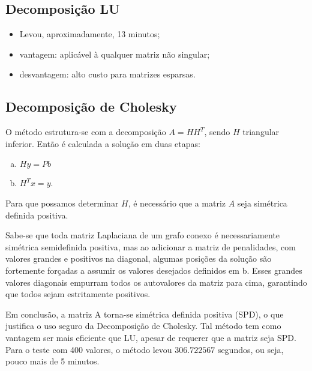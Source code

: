 \documentclass{article} %
\theoremstyle{definition}
\begin{document}
        \subsection*{Decomposição LU}
            \begin{itemize}
                \item  Levou, aproximadamente, 13 minutos;
                \item vantagem: aplicável à qualquer matriz não singular;
                \item desvantagem: alto custo para matrizes esparsas.
            \end{itemize}
            \subsection*{Decomposição de Cholesky}
            
                O método estrutura-se com a decomposição $A = HH^T$, sendo $H$ triangular
                inferior.
                Então é calculada a solução em duas etapas:
                \begin{enumerate}[a)]
                    \item $Hy = Pb$
                    \item $H^Tx = y$.
                \end{enumerate}
                Para que possamos determinar $H$, é necessário que a matriz $A$ seja simétrica
                definida positiva.

                Sabe-se que toda matriz Laplaciana de um grafo conexo é necessariamente simétrica 
                semidefinida
                positiva, mas ao adicionar a matriz de penalidades, com valores grandes e positivos 
                na diagonal,
                algumas posições da solução são fortemente forçadas a assumir os valores desejados
                definidos em b.
                Esses grandes valores diagonais empurram todos os autovalores da matriz para cima,
                garantindo
                que todos sejam estritamente positivos.

                Em conclusão, a matriz A torna-se simétrica definida positiva
                (SPD), o que justifica o uso seguro da Decomposição de Cholesky.
                Tal método tem como vantagem ser mais eficiente que LU, apesar de requerer que a 
                matriz seja SPD.
                Para o teste com 400 valores, o método levou $306.722567$ segundos, ou seja, 
                pouco mais de 5 minutos.
\end{document}
